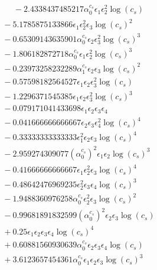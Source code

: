 \documentclass[10pt]{article}
\begin{document}
\begin{align*}
\phantom{F_{s,4}} &\phantom{={}}{}  - 2.4338437485217 \alpha_{0}^{c_s} \epsilon_{1} \epsilon_{2}^{2} \log{\left(c_{s} \right)} \\
&{}  - 5.1785875133866 \epsilon_{1} \epsilon_{2}^{2} \epsilon_{3} \log{\left(c_{s} \right)}^{2} \\
&{}  - 0.65309143635901 \alpha_{0}^{c_s} \epsilon_{2} \epsilon_{3}^{2} \log{\left(c_{s} \right)}^{3} \\
&{}  - 1.806182872718 \alpha_{0}^{c_s} \epsilon_{1} \epsilon_{2}^{2} \log{\left(c_{s} \right)}^{3} \\
&{}  - 0.23973258232289 \alpha_{1}^{c_s} \epsilon_{2} \epsilon_{3} \log{\left(c_{s} \right)}^{2} \\
&{}  - 0.57598182564527 \epsilon_{1} \epsilon_{2} \epsilon_{3}^{2} \log{\left(c_{s} \right)} \\
&{}  - 1.2296371545385 \epsilon_{1} \epsilon_{2} \epsilon_{3}^{2} \log{\left(c_{s} \right)}^{3} \\
&{}  - 0.079171041433698 \epsilon_{1} \epsilon_{2} \epsilon_{3} \epsilon_{4} \\
&{}  - 0.041666666666667 \epsilon_{2} \epsilon_{3} \epsilon_{4}^{2} \log{\left(c_{s} \right)}^{4} \\
&{}  - 0.33333333333333 \epsilon_{1}^{2} \epsilon_{2} \epsilon_{3} \log{\left(c_{s} \right)}^{4} \\
&{}  - 2.959274309077 \left(\alpha_{0}^{c_s}\right)^{2} \epsilon_{1} \epsilon_{2} \log{\left(c_{s} \right)}^{3} \\
&{}  - 0.41666666666667 \epsilon_{1} \epsilon_{2}^{2} \epsilon_{3} \log{\left(c_{s} \right)}^{4} \\
&{}  - 0.48642476969235 \epsilon_{2}^{2} \epsilon_{3} \epsilon_{4} \log{\left(c_{s} \right)}^{3} \\
&{}  - 1.9488360976258 \alpha_{0}^{c_s} \epsilon_{2}^{2} \epsilon_{3} \log{\left(c_{s} \right)}^{2} \\
&{}  - 0.99681891832599 \left(\alpha_{0}^{c_s}\right)^{2} \epsilon_{2} \epsilon_{3} \log{\left(c_{s} \right)} \\
&{}  + 0.25 \epsilon_{1} \epsilon_{2} \epsilon_{3} \epsilon_{4} \log{\left(c_{s} \right)}^{4} \\
&{}  + 0.60881560930639 \alpha_{0}^{c_s} \epsilon_{2} \epsilon_{3} \epsilon_{4} \log{\left(c_{s} \right)} \\
&{}  + 3.6123657454361 \alpha_{0}^{c_s} \epsilon_{1} \epsilon_{2} \epsilon_{3} \log{\left(c_{s} \right)}^{3} \\

\end{align*}
\end{document}
